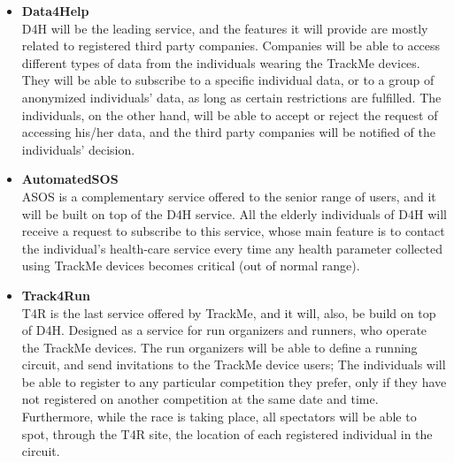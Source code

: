 \documentclass[a4paper, hidelinks, 12pt]{report}
\begin{document}
	\begin{itemize}
		\item{\textbf{Data4Help}}
		\\D4H will be the leading service, and the features it will provide are mostly related to registered third party companies. Companies will be able to access different types of data from the individuals wearing the TrackMe devices. They will be able to subscribe to a specific individual data, or to a group of anonymized individuals' data, as long as certain restrictions are fulfilled. The individuals, on the other hand, will be able to accept or reject the request of accessing his/her data, and the third party companies will be notified of the individuals' decision.
		
		\item{\textbf{AutomatedSOS}}
		\\ ASOS is a complementary service offered to the senior range of users, and it will be built on top of the D4H service. All the elderly individuals of D4H will receive a request to subscribe to this service, whose main feature is to contact the individual's health-care service every time any health parameter collected using TrackMe devices becomes critical (out of normal range).
		
		\item{\textbf{Track4Run}}
		\\T4R is the last service offered by TrackMe, and it will, also, be build on top of D4H. Designed as a service for run organizers and runners, who operate the TrackMe devices. The run organizers will be able to define a running circuit, and send invitations to the TrackMe device users; The individuals will be able to register to any particular competition they prefer, only if they have not registered on another competition at the same date and time. Furthermore, while the race is taking place, all spectators will be able to spot, through the T4R site, the location of each registered individual in the circuit.
	\end{itemize}
	
\end{document}
